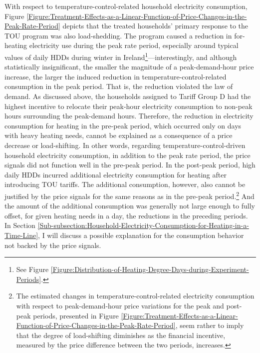 With respect to temperature-control-related household electricity consumption, Figure \ref{Figure:Treatment-Effects-as-a-Linear-Function-of-Price-Changes-in-the-Peak-Rate-Period} depicts that the treated households' primary response to the TOU program was also load-shedding. The program caused a reduction in for-heating electricity use during the peak rate period, especially around typical values of daily HDDs during winter in Ireland\footnote{See Figure \ref{Figure:Distribution-of-Heating-Degree-Days-during-Experiment-Periods}.}---interestingly, and although statistically insignificant, the smaller the magnitude of a peak-demand-hour price increase, the larger the induced reduction in temperature-control-related consumption in the peak period. That is, the reduction violated the law of demand. As discussed above, the households assigned to Tariff Group D had the highest incentive to relocate their peak-hour electricity consumption to non-peak hours surrounding the peak-demand hours. Therefore, the reduction in electricity consumption for heating in the pre-peak period, which occurred only on days with heavy heating needs, cannot be explained as a consequence of a price decrease or load-shifting. In other words, regarding temperature-control-driven household electricity consumption, in addition to the peak rate period, the price signals did not function well in the pre-peak period. In the post-peak period, high daily HDDs incurred additional electricity consumption for heating after introducing TOU tariffs. The additional consumption, however, also cannot be justified by the price signals for the same reasons as in the pre-peak period.\footnote{The estimated changes in temperature-control-related electricity consumption with respect to peak-demand-hour price variations for the peak and post-peak periods, presented in Figure \ref{Figure:Treatment-Effects-as-a-Linear-Function-of-Price-Changes-in-the-Peak-Rate-Period}, seem rather to imply that the degree of load-shifting diminishes as the financial incentive, measured by the price difference between the two periods, increases.} And the amount of the additional consumption was generally not large enough to fully offset, for given heating needs in a day, the reductions in the preceding periods. In Section \ref{Sub-subsection:Household-Electricity-Consumption-for-Heating-in-a-Time-Line}, I will discuss a possible explanation for the consumption behavior not backed by the price signals.  

